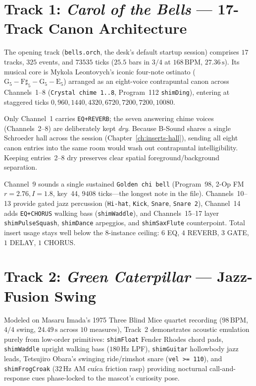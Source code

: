 \section{Track 1: \emph{Carol of the Bells} — 17-Track Canon Architecture}

The opening track (\texttt{bells.orch}, the desk's default startup session) comprises $17$ tracks, $325$ events, and $73535$ ticks ($25.5$ bars in $3/4$ at $168\,\text{BPM}$, $27.36\,\text{s}$). Its musical core is Mykola Leontovych's iconic four-note ostinato ($\mathrm{G}_5 - \mathrm{F}\sharp_5 - \mathrm{G}_5 - \mathrm{E}_5$) arranged as an eight-voice contrapuntal canon across Channels~1--8 (\texttt{Crystal chime 1..8}, Program~112 \texttt{shimDing}), entering at staggered ticks $0, 960, 1440, 4320, 6720, 7200, 7200, 10080$.

\begin{remark}
Only Channel~1 carries \texttt{EQ+REVERB}; the seven answering chime voices (Channels~2--8) are deliberately kept \emph{dry}. Because B-Sound shares a single Schroeder hall across the session (Chapter~\ref{ch:inserts-hall}), sending all eight canon entries into the same room would wash out contrapuntal intelligibility. Keeping entries~2--8 dry preserves clear spatial foreground/background separation.
\end{remark}

Channel~9 sounds a single sustained \texttt{Golden chi bell} (Program~98, 2-Op FM $r=2.76, I=1.8$, key~44, $9408$ ticks—the longest note in the file). Channels~10--13 provide gated jazz percussion (\texttt{Hi-hat}, \texttt{Kick}, \texttt{Snare}, \texttt{Snare~2}), Channel~14 adds \texttt{EQ+CHORUS} walking bass (\texttt{shimWaddle}), and Channels~15--17 layer \texttt{shimPulseSquash}, \texttt{shimDance} arpeggios, and \texttt{shimSaxFlute} counterpoint. Total insert usage stays well below the 8-instance ceiling: $6$ EQ, $4$ REVERB, $3$ GATE, $1$ DELAY, $1$ CHORUS.

\section{Track 2: \emph{Green Caterpillar} — Jazz-Fusion Swing}

Modeled on Masaru Imada's 1975 Three Blind Mice quartet recording ($98\,\text{BPM}$, $4/4$ swing, $24.49\,\text{s}$ across $10$ measures), Track~2 demonstrates acoustic emulation purely from low-order primitives: \texttt{shimFloat} Fender Rhodes chord pads, \texttt{shimWaddle} upright walking bass ($180\,\text{Hz}$ LPF), \texttt{shimGuitar} hollowbody jazz leads, Tetsujiro Obara's swinging ride/rimshot snare (\texttt{vel >= 110}), and \texttt{shimFrogCroak} ($32\,\text{Hz}$ AM cu\'ica friction rasp) providing nocturnal call-and-response cues phase-locked to the mascot's curiosity pose.

